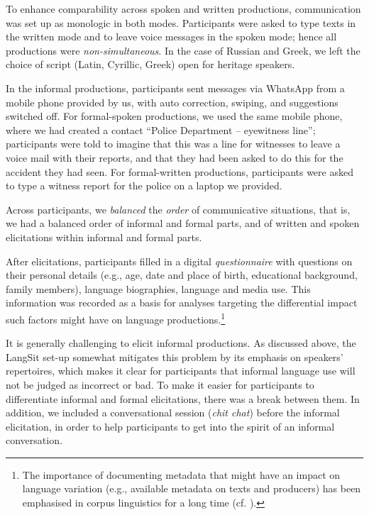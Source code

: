 \documentclass[output=paper,colorlinks,citecolor=brown]{langscibook}
\begin{document}
To enhance comparability across spoken and written productions, communication was set up as monologic in both modes. Participants were asked to type texts in the written mode and to leave voice messages in the spoken mode; hence all productions were \textit{non-simultaneous}. In the case of Russian and Greek, we left the choice of script (Latin, Cyrillic, Greek) open for heritage speakers.

In the informal productions, participants sent messages via WhatsApp from a mobile phone provided by us, with auto correction, swiping, and suggestions switched off. For formal-spoken productions, we used the same mobile phone, where we had created a contact “Police Department – eyewitness line”; participants were told to imagine that this was a line for witnesses to leave a voice mail with their reports, and that they had been asked to do this for the accident they had seen. For formal-written productions, participants were asked to type a witness report for the police on a laptop we provided.

Across participants, we \textit{balanced} the \textit{order} of communicative situations, that is, we had a balanced order of informal and formal parts, and of written and spoken elicitations within informal and formal parts.

After elicitations, participants filled in a digital \textit{questionnaire} with questions on their personal details (e.g., age, date and place of birth, educational background, family members), language biographies, language and media use. This information was recorded as a basis for analyses targeting the differential impact such factors might have on language productions.\footnote{The importance of documenting metadata that might have an impact on language variation (e.g., available metadata on texts and producers) has been emphasised in corpus linguistics for a long time (cf. \cite{sinclair1991, granger2008}).} 

It is generally challenging to elicit informal productions. As discussed above, the LangSit set-up somewhat mitigates this problem by its emphasis on speakers’ repertoires, which makes it clear for participants that informal language use will not be judged as incorrect or bad. To make it easier for participants to differentiate informal and formal elicitations, there was a break between them. In addition, we included a conversational session (\textit{chit chat}) before the informal elicitation, in order to help participants to get into the spirit of an informal conversation.
\end{document}
